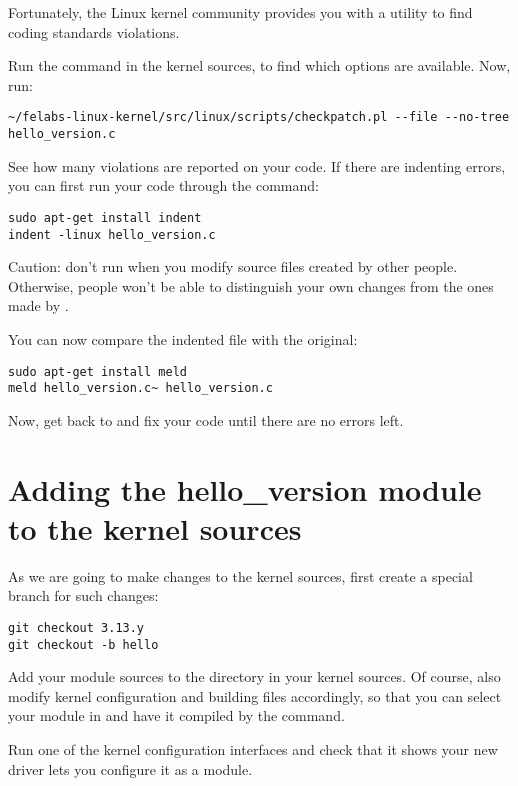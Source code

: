 Fortunately, the Linux kernel community provides you with a utility to
find coding standards violations.

Run the  command in the kernel sources,
to find which options are available.  Now, run:

\begin{verbatim}
~/felabs-linux-kernel/src/linux/scripts/checkpatch.pl --file --no-tree hello_version.c
\end{verbatim}

See how many violations are reported on your code. If there are
indenting errors, you can first run your code through the 
command:

\begin{verbatim}
sudo apt-get install indent
indent -linux hello_version.c
\end{verbatim}

Caution: don't run  when you modify source files created
by other people. Otherwise, people won't be able to distinguish your own
changes from the ones made by .

You can now compare the indented file with the original:

\begin{verbatim}
sudo apt-get install meld
meld hello_version.c~ hello_version.c
\end{verbatim}

Now, get back to  and fix your code until there are
no errors left.

\section{Adding the hello\_version module to the kernel sources}

As we are going to make changes to the kernel sources, first create a
special branch for such changes:

\begin{verbatim}
git checkout 3.13.y
git checkout -b hello
\end{verbatim}

Add your module sources to the  directory in your
kernel sources. Of course, also modify kernel configuration and
building files accordingly, so that you can select your module in
 and have it compiled by the  command.

Run one of the kernel configuration interfaces and check that it
shows your new driver lets you configure it as a module.

